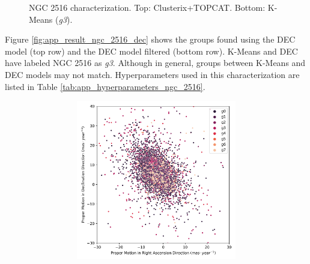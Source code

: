 \documentclass[11pt,a4paper,english,twocolumn]{article}
\begin{document}
\begin{figure}[htbp]
\begin{subfigure}{\columnwidth}
\begin{subfigure}[t]{0.30\textwidth}
    \end{subfigure}
  \end{subfigure}
  \caption{NGC 2516 characterization.
           Top: Clusterix+TOPCAT. Bottom: K-Means (\emph{g3}).}
  \label{fig:app_result_ngc_2516_clusterix_kmeans}
\end{figure}

Figure \ref{fig:app_result_ngc_2516_dec} shows the groups found using the
DEC model (top row) and the DEC model filtered (bottom row).
K-Means and DEC have labeled NGC 2516 as \emph{g3}. Although in general,
groups between K-Means and DEC models may not match.
Hyperparameters used in this characterization are listed in Table
\ref{tab:app_hyperparameters_ngc_2516}.

\begin{figure}[htbp]
  \centering
  \begin{subfigure}{\columnwidth}
    \centering
    \begin{subfigure}[t]{0.30\textwidth}
      \centering
      \includegraphics[width=\textwidth]{../figures/ngc_2516/dec_pm_ngc_2516.png}
    \end{subfigure}
    \hfill
    \begin{subfigure}[t]{0.30\textwidth}
      \centering

\end{subfigure}
\end{subfigure}
\end{figure}
\end{document}
